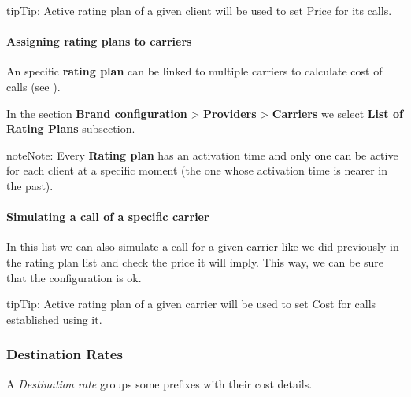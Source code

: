 \documentclass[letterpaper,10pt,english]{sphinxmanual}
\begin{document}
\begin{notice}{tip}{Tip:}
Active rating plan of a given client will be used to set Price for its calls.
\end{notice}


\paragraph{Assigning rating plans to carriers}
\label{administration_portal/brand/billing/rating_plans:assigning-rating-plans-to-carriers}\label{administration_portal/brand/billing/rating_plans:id3}
An specific \textbf{rating plan} can be linked to multiple carriers to calculate cost of calls (see {\hyperref[administration_portal/brand/providers/carriers:cost\string-calculation]{}}).

In the section \textbf{Brand configuration} \textgreater{} \textbf{Providers} \textgreater{} \textbf{Carriers} we select \textbf{List of Rating Plans} subsection.

\begin{notice}{note}{Note:}
Every \textbf{Rating plan} has an activation time and only one can be active for each
client at a specific moment (the one whose activation time is nearer in the past).
\end{notice}
\paragraph{Simulating a call of a specific carrier}

In this list we can also simulate a call for a given carrier like we did previously
in the rating plan list and check the price it will imply. This way, we can be sure
that the configuration is ok.

\begin{notice}{tip}{Tip:}
Active rating plan of a given carrier will be used to set Cost for calls established using it.
\end{notice}


\subsubsection{Destination Rates}
\label{administration_portal/brand/billing/destination_rates:id1}\label{administration_portal/brand/billing/destination_rates::doc}\label{administration_portal/brand/billing/destination_rates:destination-rates}
A \emph{Destination rate} groups some prefixes with their cost details.
\end{document}
